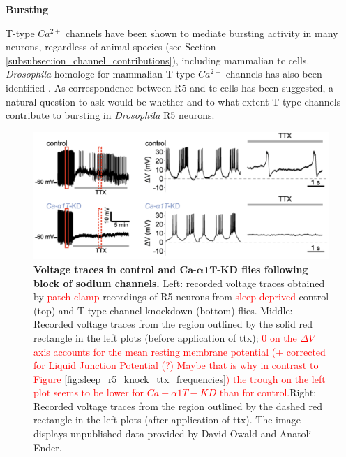 \documentclass[../main.tex]{subfiles}
\begin{document}
\noindent\textbf{Bursting}

T-type $Ca^{2+}$ channels have been shown to mediate bursting activity in many neurons, regardless of animal species (see Section \ref{subsubsec:ion_channel_contributions}), including mammalian \gls{tc} cells.  \textit{Drosophila} homologe for mammalian T-type $Ca^{2+}$ channels has also been identified \parencite{jeongCaa1TFlyTtype2015}.
As correspondence between R5 and \gls{tc} cells has been suggested, a natural question to ask would be whether and to what extent T-type channels contribute to bursting in \textit{Drosophila} R5 neurons.

\begin{figure}[!t]
    \centering
    \includegraphics[width=0.98\linewidth]{../img/sleep_and_r5_network/CaaT_knock_and_ttx/voltage_traces_labelled.png}
    \caption[Voltage traces in control and $Ca\text{-}\alpha1T\text{-KD}$ flies following block of sodium channels]{
        \textbf{Voltage traces in control and $\bm{Ca\text{-}\alpha1T\text{-KD}}$ flies following block of sodium channels.}
        Left: recorded voltage traces obtained by \textcolor{red}{patch-clamp} recordings of R5 neurons from \textcolor{red}{sleep-deprived} control (top) and T-type channel knockdown (bottom) flies.
        Middle: Recorded voltage traces from the region outlined by the solid red rectangle in the left plots (before application of \gls{ttx}); \textcolor{red}{$0$ on the $\Delta V$ axis accounts for the mean resting membrane potential (+ corrected for Liquid Junction Potential (?) Maybe that is why in contrast to Figure \ref{fig:sleep_r5_knock_ttx_frequencies}) the trough on the left plot seems to be lower for $Ca-\alpha1T-KD$ than for control.}Right: Recorded voltage traces from the region outlined by the dashed red rectangle in the left plots (after application of \gls{ttx}). The image displays unpublished data provided by David Owald and Anatoli Ender.
    }
    \label{fig:sleep_r5_knock_ttx_voltage}
\end{figure}
\end{document}
